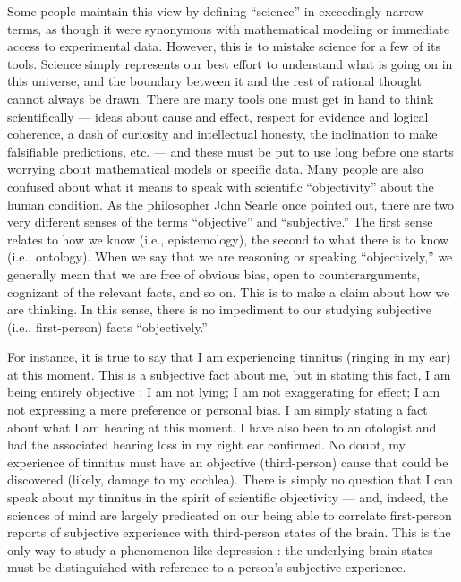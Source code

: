 \documentclass[a4paper,14pt]{extarticle}
\begin{document}
Some people maintain this view by defining ``science'' in exceedingly narrow terms, as though it were synonymous with mathematical modeling or immediate access to experimental data.
However, this is to mistake science for a few of its tools.
Science simply represents our best effort to understand what is going on in this universe, and the boundary between it and the rest of rational thought cannot always be drawn.
There are many tools one must get in hand to think scientifically --- ideas about cause and effect, respect for evidence and logical coherence, a dash of curiosity and intellectual honesty, the inclination to make falsifiable predictions, etc. --- and these must be put to use long before one starts worrying about mathematical models or specific data.
Many people are also confused about what it means to speak with scientific ``objectivity'' about the human condition.
As the philosopher John Searle once pointed out, there are two very different senses of the terms ``objective'' and ``subjective.''
The first sense relates to how we know (i.e., epistemology), the second to what there is to know (i.e., ontology).
When we say that we are reasoning or speaking ``objectively,'' we generally mean that we are free of obvious bias, open to counterarguments, cognizant of the relevant facts, and so on.
This is to make a claim about how we are thinking.
In this sense, there is no impediment to our studying subjective (i.e., first-person) facts ``objectively.''

For instance, it is true to say that I am experiencing tinnitus (ringing in my ear) at this moment.
This is a subjective fact about me, but in stating this fact, I am being entirely objective :
I am not lying;
I am not exaggerating for effect;
I am not expressing a mere preference or personal bias.
I am simply stating a fact about what I am hearing at this moment.
I have also been to an otologist and had the associated hearing loss in my right ear confirmed.
No doubt, my experience of tinnitus must have an objective (third-person) cause that could be discovered (likely, damage to my cochlea).
There is simply no question that I can speak about my tinnitus in the spirit of scientific objectivity --- and, indeed, the sciences of mind are largely predicated on our being able to correlate first-person reports of subjective experience with third-person states of the brain.
This is the only way to study a phenomenon like depression :
the underlying brain states must be distinguished with reference to a person's subjective experience.
\end{document}
